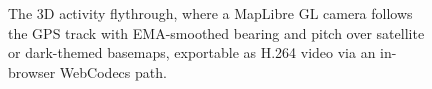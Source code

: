 \begin{figure}[ht]
\centering
{}
\caption[3D activity flythrough]{The 3D activity flythrough, where a MapLibre GL camera follows the GPS track with EMA-smoothed bearing and pitch over satellite or dark-themed basemaps, exportable as H.264 video via an in-browser WebCodecs path.}\label{fig:screenshot_flythrough}
\end{figure}
